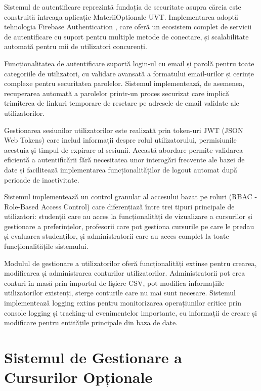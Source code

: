 \documentclass[12pt,a4paper]{report}
\begin{document}
Sistemul de autentificare reprezintă fundația de securitate asupra căreia este construită întreaga aplicație MateriiOptionale UVT. Implementarea adoptă tehnologia Firebase Authentication \cite{firebase-auth}, care oferă un ecosistem complet de servicii de autentificare cu suport pentru multiple metode de conectare, și scalabilitate automată pentru mii de utilizatori concurenți.

Funcționalitatea de autentificare suportă login-ul cu email și parolă pentru toate categoriile de utilizatori, cu validare avansată a formatului email-urilor și cerințe complexe pentru securitatea parolelor. Sistemul implementează, de asemenea, recuperarea automată a parolelor printr-un proces securizat care implică trimiterea de linkuri temporare de resetare pe adresele de email validate ale utilizatorilor.

Gestionarea sesiunilor utilizatorilor este realizată prin token-uri JWT (JSON Web Tokens) \cite{jwt-security} care includ informații despre rolul utilizatorului, permisiunile acestuia și timpul de expirare al sesiunii. Această abordare permite validarea eficientă a autentificării fără necesitatea unor interogări frecvente ale bazei de date și facilitează implementarea funcționalităților de logout automat după perioade de inactivitate.

Sistemul implementează un control granular al accesului bazat pe roluri (RBAC - Role-Based Access Control) care diferențiază între trei tipuri principale de utilizatori: studenții care au acces la funcționalități de vizualizare a cursurilor și gestionare a preferințelor, profesorii care pot gestiona cursurile pe care le predau și evaluarea studenților, și administratorii care au acces complet la toate funcționalitățile sistemului.

Modulul de gestionare a utilizatorilor oferă funcționalități extinse pentru crearea, modificarea și administrarea conturilor utilizatorilor. Administratorii pot crea conturi în masă prin importul de fișiere CSV, pot modifica informațiile utilizatorilor existenți, sterge conturile care nu mai sunt necesare. Sistemul implementează logging extins pentru monitorizarea operațiunilor critice prin console logging și tracking-ul evenimentelor importante, cu informații de creare și modificare pentru entitățile principale din baza de date.

\section{Sistemul de Gestionare a Cursurilor Opționale}
\end{document}
